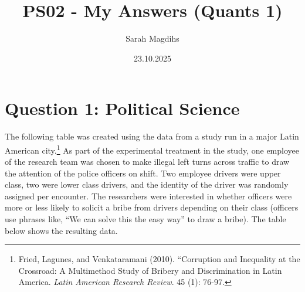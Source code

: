 \documentclass[12pt,letterpaper]{article}
\title{PS02 - My Answers (Quants 1)}
\date{23.10.2025}
\author{Sarah Magdihs}
\begin{document}
	\maketitle
	\section*{Question 1: Political Science}
		\vspace{.25cm}
	The following table was created using the data from a study run in a major Latin American city.\footnote{Fried, Lagunes, and Venkataramani (2010). ``Corruption and Inequality at the Crossroad: A Multimethod Study of Bribery and Discrimination in Latin America. \textit{Latin American Research Review}. 45 (1): 76-97.} As part of the experimental treatment in the study, one employee of the research team was chosen to make illegal left turns across traffic to draw the attention of the police officers on shift. Two employee drivers were upper class, two were lower class drivers, and the identity of the driver was randomly assigned per encounter. The researchers were interested in whether officers were more or less likely to solicit a bribe from drivers depending on their class (officers use phrases like, ``We can solve this the easy way'' to draw a bribe). The table below shows the resulting data.
\end{document}
